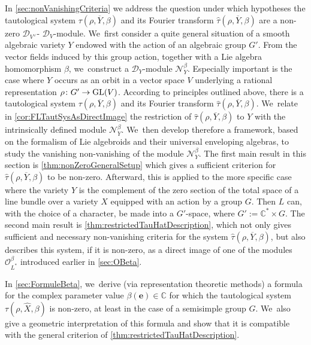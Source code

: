\documentclass[JEP,XML,SOM,Unicode,published]{cedram}
\let\mathds\mathbb
\newcommand{\bme}{{\boldsymbol{e}}}
\newcommand{\dC}{{\mathds C}}\let\C\dC
\newcommand{\cO}{\mathcal{O}}\let\O\cO
\DeclareMathOperator{\GL}{\textup{GL}}
\begin{document}
In \cref{sec:nonVanishingCriteria} we address the question under which hypotheses the tautological system
$\tau(\rho,\overline{Y},\beta)$ and its Fourier transform $\hat{\tau}(\rho,\overline{Y},\beta)$ are a non-zero $\mathscr{D}_{V^\vee}$- \resp $\mathscr{D}_V$\nobreakdash-mod\-ule. We~first consider a quite general situation of a smooth algebraic variety $Y$ endowed with the action of an algebraic group $G'$. From the vector fields induced by this group action, together with a Lie algebra homomorphism $\beta$, we~construct a $\mathscr{D}_Y$\nobreakdash-mod\-ule $\mathscr{N}_Y^\beta$. Especially important is the case where $Y$ occurs as an orbit in a vector space $V$ underlying a rational representation $\rho\colon G'\to \GL(V)$. According to principles outlined above, there is a tautological system $\tau(\rho,\overline{Y},\beta)$ and its Fourier transform $\hat{\tau}(\rho,\overline{Y},\beta)$. We~relate in \cref{cor:FLTautSysAsDirectImage} the restriction of $\hat{\tau}(\rho,\overline{Y},\beta)$ to $Y$ with the intrinsically defined module $\mathscr{N}_Y^\beta$. We~then develop therefore a framework, based on the formalism of Lie algebroids and their universal enveloping algebras, to study the vanishing \resp non-vanishing of the module $\mathscr{N}_Y^\beta$. The first main result in this section is \cref{thm:nonZeroGeneralSetup} which gives a sufficient criterion for $\hat{\tau}(\rho, \overline{Y},\beta)$ to be non-zero. Afterward, this is applied to the more specific case where the variety $Y$ is the complement of the zero section of the total space of a line bundle over a variety $X$ equipped with an action by a group $G$. Then $L$ can, with the choice of a character, be made into a $G'$-space, where $G':=\dC^*\times G$. The second main result is \cref{thm:restrictedTauHatDescription}, which not only gives sufficient and necessary non-vanishing criteria for the
system $\hat{\tau}(\rho,\overline{Y},\beta)$, but also describes this system, if it is non-zero, as a direct image of one of the modules $\cO_{L^*}^\beta$ introduced earlier in \cref{sec:OBeta}.

In \cref{sec:FormuleBeta}, we~derive (via representation theoretic methods) a formula for the complex parameter value $\beta(\bme)\in \dC$
for which the tautological system $\tau(\rho, \hat{X}, \beta)$ is non-zero, at least in the case of a semisimple group $G$. We~also give a geometric interpretation of this formula and show that it is compatible with the general criterion of \cref{thm:restrictedTauHatDescription}.
\end{document}
